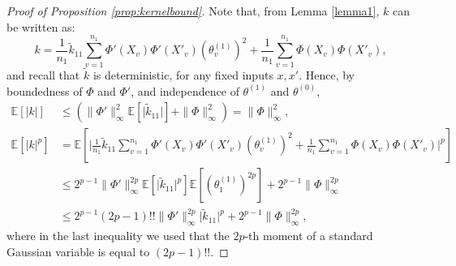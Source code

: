 \documentclass{article}
\theoremstyle{definition}
\theoremstyle{remark}
\numberwithin{equation}{section}
\newcommand{\E}{\mathbb{E}}
\newcommand{\norm}[2]{
    \|#1\|_{#2}
}
\begin{document}
\begin{proof}[Proof of Proposition \ref{prop:kernelbound}]
    Note that, from Lemma \ref{lemma1}, $k$ can be written as:
    \[
    k = \frac{1}{n_1}\tilde k_{11}\sum_{v=1}^{n_1}\Phi'(X_v)\Phi'(X'_v)(\theta^{(1)}_v)^2 + \frac{1}{n_1}\sum_{v=1}^{n_1}\Phi(X_v)\Phi(X'_v),
    \]
    and recall that $\tilde k$ is deterministic, for any fixed inputs $x,x'$.
    Hence, by boundedness of $\Phi$ and $\Phi'$, and independence of $\theta^{(1)}$ and $\theta^{(0)}$,
    \begin{align}
        \E[\vert k\vert] &\le (\norm{\Phi'}{\infty}^2\E[\vert \tilde k_{11}\vert] + \norm{\Phi}{\infty}^2) = \norm{\Phi}{\infty}^2,\\
        \E[\vert k\vert^p] &= \E[\vert \frac{1}{n_1}\tilde k_{11}\sum_{v=1}^{n_1}\Phi'(X_v)\Phi'(X'_v)(\theta^{(1)}_v)^2 + \frac{1}{n_1}\sum_{v=1}^{n_1}\Phi(X_v)\Phi(X'_v)\vert^p]\\
        &\le 2^{p-1}\norm{\Phi'}{\infty}^{2p}\E[\vert \tilde k_{11}\vert^p]\E[(\theta^{(1)}_1)^{2p}] + 2^{p-1}\norm{\Phi}{\infty}^{2p}\\
        &\le 2^{p-1}(2p-1)!!\norm{\Phi'}{\infty}^{2p}\vert \tilde k_{11}\vert^p + 2^{p-1}\norm{\Phi}{\infty}^{2p},
    \end{align}
    where in the last inequality we used that the $2p$-th moment of a standard Gaussian variable is equal to $(2p-1)!!$.
    
\end{proof}
\end{document}
